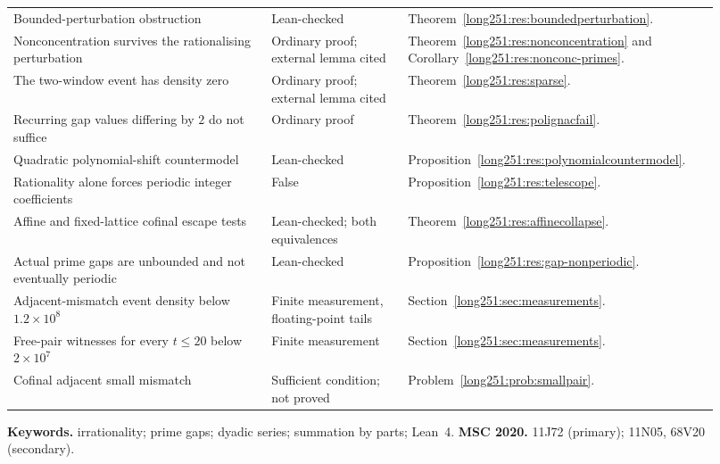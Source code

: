 \documentclass[11pt]{article}
\begin{document}
\begin{longtable}{@{}
  >{\raggedright\arraybackslash}p{0.34\linewidth}
  >{\raggedright\arraybackslash}p{0.18\linewidth}
  >{\raggedright\arraybackslash}p{0.40\linewidth}@{}}
Bounded-perturbation obstruction & Lean-checked & Theorem~\ref{long251:res:boundedperturbation}. \\
Nonconcentration survives the rationalising perturbation & Ordinary proof; external lemma cited & Theorem~\ref{long251:res:nonconcentration} and Corollary~\ref{long251:res:nonconc-primes}. \\
The two-window event has density zero & Ordinary proof; external lemma cited & Theorem~\ref{long251:res:sparse}. \\
Recurring gap values differing by $2$ do not suffice & Ordinary proof & Theorem~\ref{long251:res:polignacfail}. \\
Quadratic polynomial-shift countermodel & Lean-checked & Proposition~\ref{long251:res:polynomialcountermodel}. \\
Rationality alone forces periodic integer coefficients & False & Proposition~\ref{long251:res:telescope}. \\
Affine and fixed-lattice cofinal escape tests & Lean-checked; both equivalences & Theorem~\ref{long251:res:affinecollapse}. \\
Actual prime gaps are unbounded and not eventually periodic & Lean-checked & Proposition~\ref{long251:res:gap-nonperiodic}. \\
Adjacent-mismatch event density below $1.2\times10^{8}$ & Finite measurement, floating-point tails & Section~\ref{long251:sec:measurements}. \\
Free-pair witnesses for every $t\le20$ below $2\times10^{7}$ & Finite measurement & Section~\ref{long251:sec:measurements}. \\
Cofinal adjacent small mismatch & Sufficient condition; not proved & Problem~\ref{long251:prob:smallpair}. \\
\bottomrule
\end{longtable}
\endgroup

\smallskip
{}

\medskip
\noindent\textbf{Keywords.} irrationality; prime gaps; dyadic series;
summation by parts; Lean~4.
\qquad
\textbf{MSC 2020.} 11J72 (primary); 11N05, 68V20 (secondary).
\end{document}
